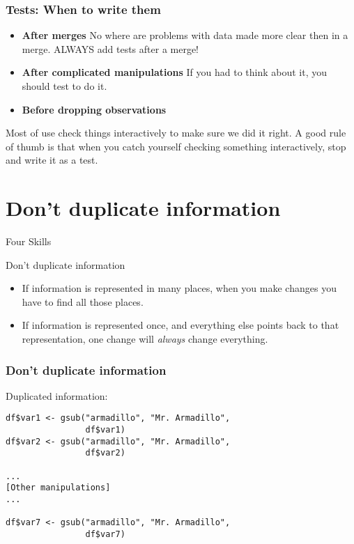 \documentclass[11pt]{beamer}
\begin{document}
\begin{frame}\frametitle{Tests: When to write them}

\begin{itemize}
    \pause \item \textbf{After merges} No where are problems with data made more clear then in a merge. ALWAYS add tests after a merge!
    \pause \item \textbf{After complicated manipulations} If you had to think about it, you should test to do it.
    \pause \item \textbf{Before dropping observations}
\end{itemize}

\vspace{1cm}
\pause Most of use check things interactively to make sure we did it right. A good rule of thumb is that when you catch yourself checking something interactively, stop and write it as a test.

\end{frame}


\section{Don't duplicate information}


\begin{frame}[c]{Four Skills}
    \tableofcontents[currentsection]
\end{frame}


\begin{frame}[fragile]{Don't duplicate information}

\begin{itemize}
    \pause \item If information is represented in many places, when you make changes you have to find all those places.
    \pause \item If information is represented once, and everything else points back to that representation, one change will \emph{always} change everything.
\end{itemize}

\end{frame}

\begin{frame}[fragile]\frametitle{Don't duplicate information}

Duplicated information:
\vspace{0.5cm}
\begin{verbatim}
df$var1 <- gsub("armadillo", "Mr. Armadillo",
                df$var1)
df$var2 <- gsub("armadillo", "Mr. Armadillo",
                df$var2)

...
[Other manipulations]
...

df$var7 <- gsub("armadillo", "Mr. Armadillo",
                df$var7)
\end{verbatim}
\end{frame}
\end{document}
